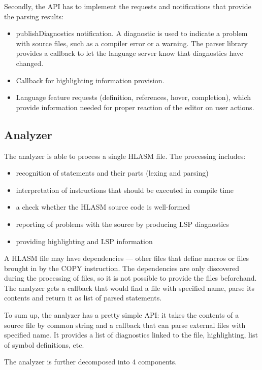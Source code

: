 Secondly, the API has to implement the requests and notifications that provide the parsing results:
\begin{itemize}
	\item publishDiagnostics notification. A diagnostic is used to indicate a problem with source files, such as a compiler error or a warning. The parser library provides a callback to let the language server know that diagnostics have changed.
	\item Callback for highlighting information provision.
	\item Language feature requests (definition, references, hover, completion), which provide information needed for proper reaction of the editor on user actions.
\end{itemize}

\subsection{Analyzer}

The analyzer is able to process a single HLASM file. The processing includes:
\begin{itemize}
 \item recognition of statements and their parts (lexing and parsing)
 \item interpretation of instructions that should be executed in compile time
 \item a check whether the HLASM source code is well-formed
 \item reporting of problems with the source by producing LSP diagnostics
 \item providing highlighting and LSP information
\end{itemize}

A HLASM file may have dependencies --- other files that define macros or files brought in by the COPY instruction. The dependencies are only discovered during the processing of files, so it is not possible to provide the files beforehand. The analyzer gets a callback that would find a file with specified name, parse its contents and return it as list of parsed statements. 

To sum up, the analyzer has a pretty simple API: it takes the contents of a source file by common string and a callback that can parse external files with specified name. It provides a list of diagnostics linked to the file, highlighting, list of symbol definitions, etc.

The analyzer is further decomposed into 4 components.

